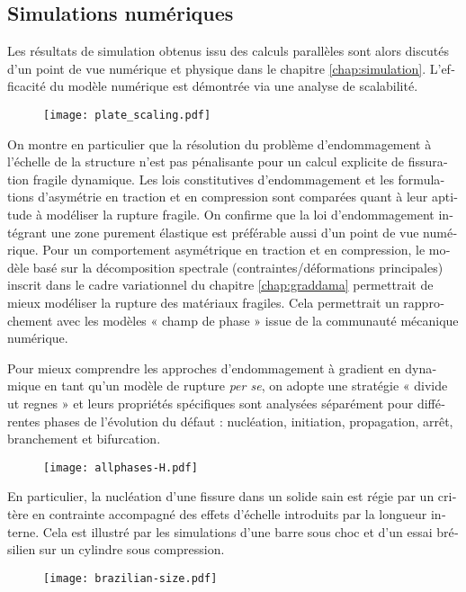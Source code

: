 \begin{otherlanguage}{french}
\section*{Simulations numériques}
Les résultats de simulation obtenus issu des calculs parallèles sont alors discutés d'un point de vue numérique et physique dans le chapitre \ref{chap:simulation}. L'efficacité du modèle numérique est démontrée via une analyse de scalabilité.
\begin{figure}[htbp]
\centering
\texttt{[image: plate\_scaling.pdf]}
\end{figure}
On montre en particulier que la résolution du problème d'endommagement à l'échelle de la structure n'est pas pénalisante pour un calcul explicite de fissuration fragile dynamique. Les lois constitutives d'endommagement et les formulations d'asymétrie en traction et en compression sont comparées quant à leur aptitude à modéliser la rupture fragile. On confirme que la loi d'endommagement intégrant une zone purement élastique est préférable aussi d'un point de vue numérique. Pour un comportement asymétrique en traction et en compression, le modèle basé sur la décomposition spectrale (contraintes/déformations principales) inscrit dans le cadre variationnel du chapitre \ref{chap:graddama} permettrait de mieux modéliser la rupture des matériaux fragiles. Cela permettrait un rapprochement avec les modèles « champ de phase » issue de la communauté mécanique numérique.

Pour mieux comprendre les approches d'endommagement à gradient en dynamique en tant qu'un modèle de rupture \emph{per se}, on adopte une stratégie « divide ut regnes » et leurs propriétés spécifiques sont analysées séparément pour différentes phases de l'évolution du défaut : nucléation, initiation, propagation, arrêt, branchement et bifurcation.
\begin{figure}[htbp]
\centering
\texttt{[image: allphases-H.pdf]}
\end{figure}

En particulier, la nucléation d'une fissure dans un solide sain est régie par un critère en contrainte accompagné des effets d'échelle introduits par la longueur interne. Cela est illustré par les simulations d'une barre sous choc et d'un essai brésilien sur un cylindre sous compression.
\begin{figure}[htbp]
\centering
\texttt{[image: brazilian-size.pdf]}
\end{figure}


\end{otherlanguage}
